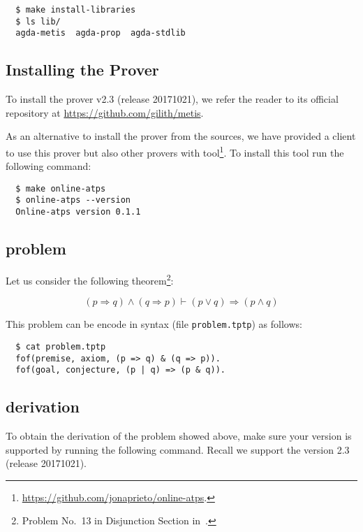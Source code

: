 \documentclass[../main.tex]{subfiles}
\begin{document}
\begin{subappendices}
\begin{verbatim}
  $ make install-libraries
  $ ls lib/
  agda-metis  agda-prop  agda-stdlib
\end{verbatim}

\subsection{Installing the \Metis Prover}

To install the \Metis prover v2.3 (release 20171021),
we refer the reader to its official
repository at \url{https://github.com/gilith/metis}.

As an alternative to install the prover from the \Metis sources,
we have provided a \Haskell client
to use this prover but also other provers with 
tool\footnote{\url{https://github.com/jonaprieto/online-atps}.}.
To install this tool run the following command:

\begin{verbatim}
  $ make online-atps
  $ online-atps --version
  Online-atps version 0.1.1
\end{verbatim}

\subsection{\TPTP problem}

Let us consider the following
theorem\footnote{Problem No.~13 in Disjunction Section in~\cite{Prieto-Cubides2017}.}:

\begin{equation}
\label{eq:complete-example-problem}
(p \Rightarrow q) \wedge (q \Rightarrow p) ⊢ (p \vee q) \Rightarrow (p \wedge q)
\end{equation}

This problem can be encode in \TPTP syntax (file \verb!problem.tptp!) as follows:

\begin{verbatim}
  $ cat problem.tptp
  fof(premise, axiom, (p => q) & (q => p)).
  fof(goal, conjecture, (p | q) => (p & q)).
\end{verbatim}

\subsection{\Metis derivation}

To obtain the \Metis derivation of the \TPTP problem showed above,
make sure your \Metis version is supported by running the following
command. Recall we support the version 2.3 (release 20171021).


\end{subappendices}
\end{document}
